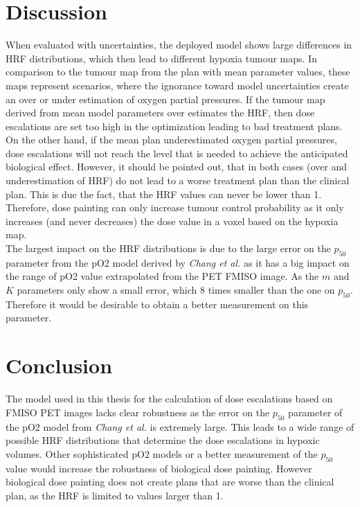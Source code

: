 \section{Discussion}
When evaluated with uncertainties, the deployed model shows large differences in HRF distributions, which then lead to different hypoxia tumour maps. In comparison to the tumour map from the plan with mean parameter values, these maps represent scenarios, where the ignorance toward model uncertainties create an over or under estimation of oxygen partial pressures. If the tumour map derived from mean model parameters over estimates the HRF, then dose escalations are set too high in the optimization leading to bad treatment plans. On the other hand, if the mean plan underestimated oxygen partial pressures, dose escalations will not reach the level that is needed to achieve the anticipated biological effect. However, it should be pointed out, that in both cases (over and underestimation of HRF) do not lead to a worse treatment plan than the clinical plan. This is due the fact, that the HRF values can never be lower than 1. Therefore, dose painting can only increase tumour control probability as it only increases (and never decreases) the dose value in a voxel based on the hypoxia map.\\The largest impact on the HRF distributions is due to the large error on the $p_{50}$ parameter from the pO2 model derived by \textit{Chang et al.}\cite{pmid19994538}  as it has a big impact on the range of pO2 value extrapolated from the PET FMISO image. As the $m$ and $K$ parameters only show a small error, which 8 times smaller than the one on $p_{50}$. Therefore it would be desirable to obtain a better measurement on this parameter. 
\section{Conclusion}
The model used in this thesis for the calculation of dose escalations based on FMISO PET images lacks clear robustness as the error on the $p_{50}$ parameter of the pO2 model from \textit{Chang et al.}\cite{pmid19994538} is extremely large. This leads to a wide range of possible HRF distributions that determine the dose escalations in hypoxic volumes. Other sophisticated pO2 models or a better measurement of the $p_{50}$ value would increase the robustness of biological dose painting. However biological dose painting does not create plans that are worse than the clinical plan, as the HRF is limited to values larger than 1.